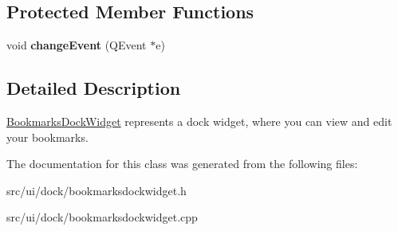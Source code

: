\subsection*{Protected Member Functions}
\begin{DoxyCompactItemize}
\item 
\hypertarget{classBookmarksDockWidget_a8a64e004a8fa3fdd04c3ead59d6beb9b}{
void {\bfseries changeEvent} (QEvent $\ast$e)}
\label{classBookmarksDockWidget_a8a64e004a8fa3fdd04c3ead59d6beb9b}

\end{DoxyCompactItemize}


\subsection{Detailed Description}
\hyperlink{classBookmarksDockWidget}{BookmarksDockWidget} represents a dock widget, where you can view and edit your bookmarks. 

The documentation for this class was generated from the following files:\begin{DoxyCompactItemize}
\item 
src/ui/dock/bookmarksdockwidget.h\item 
src/ui/dock/bookmarksdockwidget.cpp\end{DoxyCompactItemize}
